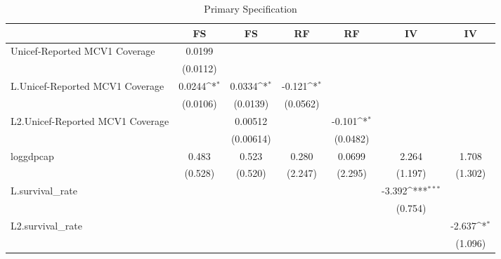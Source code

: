 \begin{table}[htbp]\centering
\def\sym#1{\ifmmode^{#1}\else\(^{#1}\)\fi}
\caption{Primary Specification}
\begin{tabular}{l*{6}{c}}
\toprule
                &\multicolumn{1}{c}{FS}&\multicolumn{1}{c}{FS}&\multicolumn{1}{c}{RF}&\multicolumn{1}{c}{RF}&\multicolumn{1}{c}{IV}&\multicolumn{1}{c}{IV}\\
\midrule
Unicef-Reported MCV1 Coverage&   0.0199         &                  &                  &                  &                  &                  \\
                & (0.0112)         &                  &                  &                  &                  &                  \\
\addlinespace
L.Unicef-Reported MCV1 Coverage&   0.0244\sym{*}  &   0.0334\sym{*}  &   -0.121\sym{*}  &                  &                  &                  \\
                & (0.0106)         & (0.0139)         & (0.0562)         &                  &                  &                  \\
\addlinespace
L2.Unicef-Reported MCV1 Coverage&                  &  0.00512         &                  &   -0.101\sym{*}  &                  &                  \\
                &                  &(0.00614)         &                  & (0.0482)         &                  &                  \\
\addlinespace
loggdpcap       &    0.483         &    0.523         &    0.280         &   0.0699         &    2.264         &    1.708         \\
                &  (0.528)         &  (0.520)         &  (2.247)         &  (2.295)         &  (1.197)         &  (1.302)         \\
\addlinespace
L.survival\_rate &                  &                  &                  &                  &   -3.392\sym{***}&                  \\
                &                  &                  &                  &                  &  (0.754)         &                  \\
\addlinespace
L2.survival\_rate&                  &                  &                  &                  &                  &   -2.637\sym{*}  \\
                &                  &                  &                  &                  &                  &  (1.096)         \\

\end{tabular}
\end{table}
